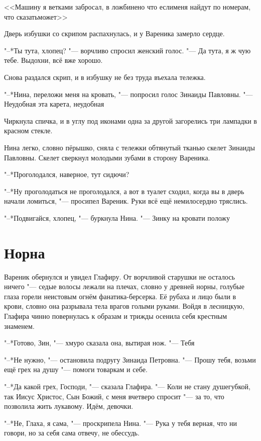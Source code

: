 <<Машину я ветками забросал, в ложбине\ldotst но что если\ldotsq меня найдут по номерам, что сказать\ldotsq может\ldotsq>>

Дверь избушки со скрипом распахнулась, и у Вареника замерло сердце.

"--*Ты тута, хлопец? "--- ворчливо спросил женский голос.
"--- Да тута, я ж чую тебе.
Выдохни, всё вже хорошо.

Снова раздался скрип, и в избушку не без труда въехала тележка.

"--*Нина, переложи меня на кровать, "--- попросил голос Зинаиды Павловны.
"--- Неудобная эта карета, неудобная\ldotst

Чиркнула спичка, и в углу под иконами одна за другой загорелись три лампадки в красном стекле.

Нина легко, словно пёрышко, сняла с тележки обтянутый тканью скелет Зинаиды Павловны.
Скелет сверкнул молодыми зубами в сторону Вареника.

"--*Проголодался, наверное, тут сидючи?

"--*Ну проголодаться не проголодался, а вот в туалет сходил, когда вы в дверь начали ломиться, "--- просипел Вареник.
Руки всё ещё немилосердно тряслись.

"--*Подвигайся, хлопец, "--- буркнула Нина.
"--- Зинку на кровати положу\ldotst

\section{Норна}

Вареник обернулся и увидел Глафиру.
От ворчливой старушки не осталось ничего "--- седые волосы лежали на плечах, словно у древней норны, голубые глаза горели неистовым огнём фанатика-берсерка.
Её рубаха и лицо были в крови, словно она разрывала тела врагов голыми руками.
Войдя в лесницкую, Глафира чинно повернулась к образам и трижды осенила себя крестным знаменем.

"--*Готово, Зин, "--- хмуро сказала она, вытирая нож.
"--- Тебя\ldotsq

"--*Не нужно, "--- остановила подругу Зинаида Петровна.
"--- Прошу тебя, возьми ещё грех на душу "--- помоги товаркам и себе.

"--*Да какой грех, Господи, "--- сказала Глафира.
"--- Коли не стану душегубкой, так Иисус Христос, Сын Божий, с меня вчетверо спросит "--- за то, что позволила жить лукавому.
Идём, девочки.

"--*Не, Глаха, я сама, "--- проскрипела Нина.
"--- Рука у тебя верная, что ни говори, но за себя сама отвечу, не обессудь.

